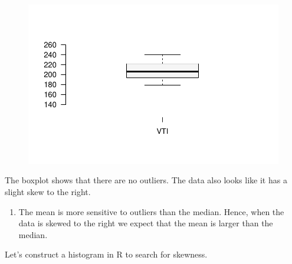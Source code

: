\documentclass[
  letterpaper,
  DIV=11,
  numbers=noendperiod]{scrreprt}
\providecommand{\tightlist}{%
  \setlength{\itemsep}{0pt}\setlength{\parskip}{0pt}}\usepackage{longtable,booktabs,array}
\begin{document}
\begin{figure}[H]

{\centering \includegraphics{./06-DescriptiveV_files/figure-pdf/unnamed-chunk-5-1.pdf}

}

\end{figure}

The boxplot shows that there are no outliers. The data also looks like
it has a slight skew to the right.

\begin{enumerate}
\def\labelenumi{\arabic{enumi}.}
\setcounter{enumi}{1}
\tightlist
\item
  The mean is more sensitive to outliers than the median. Hence, when
  the data is skewed to the right we expect that the mean is larger than
  the median.
\end{enumerate}

Let's construct a histogram in R to search for skewness.
\end{document}

